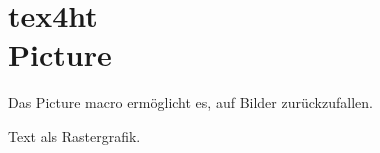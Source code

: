 \documentclass[a4paper]{amsart}
\begin{document}
\section{tex4ht \\Picture}

Das Picture macro ermöglicht es, auf Bilder zurückzufallen.

\Picture*{}
Text als Rastergrafik.
\EndPicture
\end{document}
